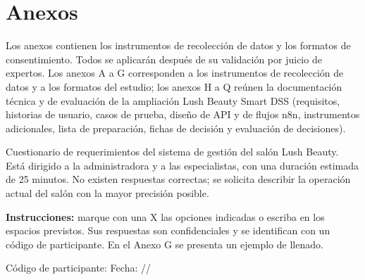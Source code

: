 \section{Anexos}\label{cap:anexos}

Los anexos contienen los instrumentos de recolección de datos y los formatos de consentimiento. Todos se aplicarán después de su validación por juicio de expertos. Los anexos A a G corresponden a los instrumentos de recolección de datos y a los formatos del estudio; los anexos H a Q reúnen la documentación técnica y de evaluación de la ampliación Lush Beauty Smart DSS (requisitos, historias de usuario, casos de prueba, diseño de API y de flujos n8n, instrumentos adicionales, lista de preparación, fichas de decisión y evaluación de decisiones).



Cuestionario de requerimientos del sistema de gestión del salón Lush Beauty. Está dirigido a la administradora y a las especialistas, con una duración estimada de 25 minutos. No existen respuestas correctas; se solicita describir la operación actual del salón con la mayor precisión posible.


\textbf{Instrucciones:} marque con una X las opciones indicadas o escriba en los espacios previstos. Sus respuestas son confidenciales y se identifican con un código de participante. En el Anexo G se presenta un ejemplo de llenado.


Código de participante:      Fecha: //










